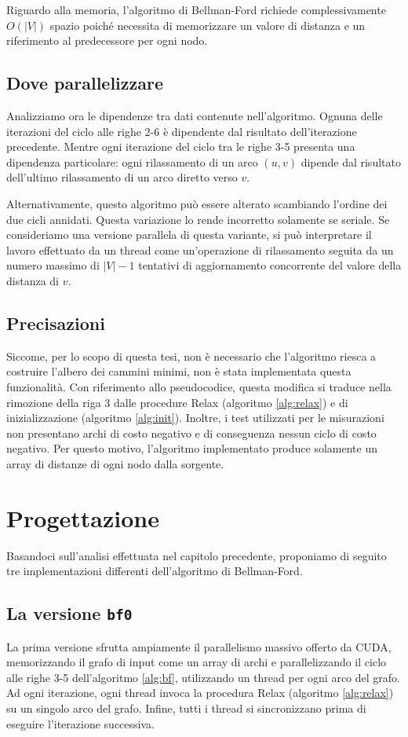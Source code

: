 \documentclass[12pt,a4paper,oneside]{book}
\begin{document}
	Riguardo alla memoria, l'algoritmo di Bellman-Ford richiede complessivamente $O(|V|)$ spazio poiché necessita di memorizzare un valore di distanza e un riferimento al predecessore per ogni nodo.
	
	\section{Dove parallelizzare}
	Analizziamo ora le dipendenze tra dati contenute nell'algoritmo. Ognuna delle iterazioni del ciclo alle righe 2-6 è dipendente dal risultato dell'iterazione precedente. Mentre ogni iterazione del ciclo tra le righe 3-5 presenta una dipendenza particolare: ogni rilassamento di un arco $(u,v)$ dipende dal risultato dell'ultimo rilassamento di un arco diretto verso $v$.
	
	Alternativamente, questo algoritmo può essere alterato scambiando l'ordine dei due cicli annidati. Questa variazione lo rende incorretto solamente se seriale. Se consideriamo una versione parallela di questa variante, si può interpretare il lavoro effettuato da un thread come un'operazione di rilassamento seguita da un numero massimo di $|V|-1$ tentativi di aggiornamento concorrente del valore della distanza di $v$.
	
	\section{Precisazioni}
	Siccome, per lo scopo di questa tesi, non è necessario che l'algoritmo riesca a costruire l'albero dei cammini minimi, non è stata implementata questa funzionalità. Con riferimento allo pseudocodice, questa modifica si traduce nella rimozione della riga 3 dalle procedure Relax (algoritmo \ref{alg:relax}) e di inizializzazione (algoritmo \ref{alg:init}). Inoltre, i test utilizzati per le misurazioni non presentano archi di costo negativo e di conseguenza nessun ciclo di costo negativo. Per questo motivo, l'algoritmo implementato produce solamente un array di distanze di ogni nodo dalla sorgente.
	
	\chapter{Progettazione}
	\label{chap:progettazione}
	Basandoci sull'analisi effettuata nel capitolo precedente, proponiamo di seguito tre implementazioni differenti dell'algoritmo di Bellman-Ford.
	
	\section{La versione \texttt{bf0}}
	La prima versione sfrutta ampiamente il parallelismo massivo offerto da CUDA, memorizzando il grafo di input come un array di archi e parallelizzando il ciclo alle righe 3-5 dell'algoritmo \ref{alg:bf}, utilizzando un thread per ogni arco del grafo. Ad ogni iterazione, ogni thread invoca la procedura Relax (algoritmo \ref{alg:relax}) su un singolo arco del grafo. Infine, tutti i thread si sincronizzano prima di eseguire l'iterazione successiva.
	
\end{document}
